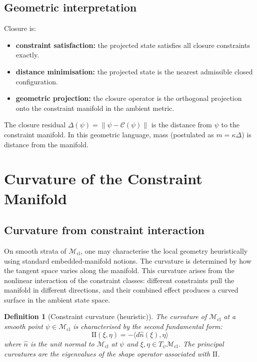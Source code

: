 \documentclass[12pt]{article}
\newtheorem{definition}[theorem]{Definition}
\newcommand{\Mcl}{\mathcal{M}_{\mathrm{cl}}}
\newcommand{\Ccal}{\mathcal{C}}
\begin{document}
\subsection{Geometric interpretation}

Closure is:
\begin{itemize}
    \item \textbf{constraint satisfaction:} the projected state satisfies all closure constraints exactly.
    \item \textbf{distance minimisation:} the projected state is the nearest admissible closed configuration.
    \item \textbf{geometric projection:} the closure operator is the orthogonal projection onto the constraint manifold in the ambient metric.
\end{itemize}

The closure residual $\Delta(\psi) = \|\psi - \Ccal(\psi)\|$ is the distance from $\psi$ to the constraint manifold. In this geometric language, mass (postulated as $m = \kappa\Delta$) is distance from the manifold.

\section{Curvature of the Constraint Manifold}\label{sec:curvature}

\subsection{Curvature from constraint interaction}

On smooth strata of $\Mcl$, one may characterise the local geometry heuristically using standard embedded-manifold notions. The curvature is determined by how the tangent space varies along the manifold. This curvature arises from the nonlinear interaction of the constraint classes: different constraints pull the manifold in different directions, and their combined effect produces a curved surface in the ambient state space.

\begin{definition}[Constraint curvature (heuristic)]\label{def:curvature}
The curvature of $\Mcl$ at a smooth point $\psi \in \Mcl$ is characterised by the second fundamental form:
\begin{equation}
    \mathrm{II}(\xi, \eta) = -\langle d\hat{n}(\xi), \eta\rangle
\end{equation}
where $\hat{n}$ is the unit normal to $\Mcl$ at $\psi$ and $\xi, \eta \in T_\psi \Mcl$. The principal curvatures are the eigenvalues of the shape operator associated with $\mathrm{II}$.
\end{definition}
\end{document}
